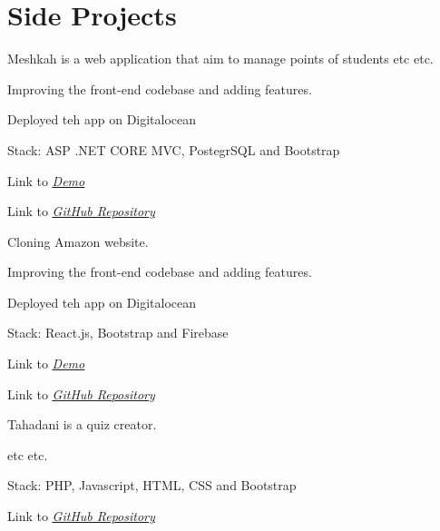 \documentclass[]{main}
\begin{document}
\begin{minipage}[t]{0.66\textwidth}
\section{Side Projects}

\begin{tightemize}
\item Meshkah is a web application that aim to manage points of students etc etc.
\item Improving the front-end codebase and adding features. 
\item Deployed teh app on Digitalocean
\item Stack: ASP .NET CORE MVC, PostegrSQL and Bootstrap 
\item Link to \href{http://Meshkah.Mosaibah.com}{\underline{\emph{Demo}}}
\item Link to \href{https://github.com/Mosaibah/Meshkah}{\underline{\emph{GitHub Repository}}}
\end{tightemize}
\sectionsep

\begin{tightemize}
\item Cloning Amazon website.
\item Improving the front-end codebase and adding features. 
\item Deployed teh app on Digitalocean
\item Stack: React.js, Bootstrap and Firebase
\item Link to \href{https://clone-72059.web.app/}{\underline{\emph{Demo}}}
\item Link to \href{https://github.com/Mosaibah/amazon-clone}{\underline{\emph{GitHub Repository}}}
\end{tightemize}
\sectionsep


\begin{tightemize}
\item Tahadani is a quiz creator.
\item etc etc. 
\item Stack: PHP, Javascript, HTML, CSS and Bootstrap
\item Link to \href{https://github.com/Mosaibah/quiz-creator}{\underline{\emph{GitHub Repository}}}
\end{tightemize}
\sectionsep





\end{minipage} 
\end{document}

